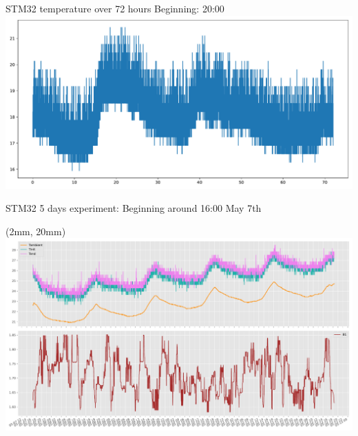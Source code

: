 \begin{frame}{STM32 temperature over 72 hours}
	Beginning: 20:00
	\includegraphics[width=\textwidth]{./figures/temp3days.pdf}
\end{frame}

\begin{frame}{STM32 5 days experiment: Beginning around 16:00 May 7th}
    \begin{textblock*}{130mm}(2mm, 20mm)
    	\centering
		\includegraphics[width=\textwidth]{./figures/stm32_b1_temp_pljours.pdf}
	\end{textblock*}
\end{frame}
